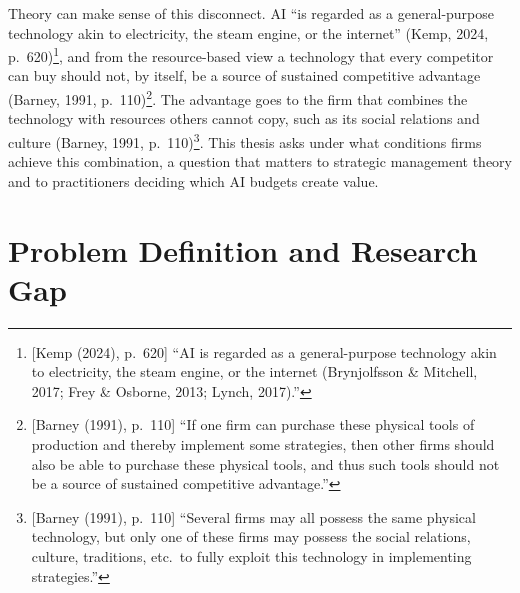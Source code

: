 \documentclass[12pt, a4paper]{article}
\begin{document}
Theory can make sense of this disconnect. AI ``is regarded as a general-purpose technology akin
to electricity, the steam engine, or the internet'' (Kemp, 2024, p.~620)\footnote{[Kemp (2024), p.~620] ``AI is regarded as a general-purpose technology akin to electricity, the steam engine, or the internet (Brynjolfsson \& Mitchell, 2017; Frey \& Osborne, 2013; Lynch, 2017).''},
and from the resource-based view a technology that every competitor can buy
should not, by itself, be a source of sustained competitive advantage (Barney,
1991, p.~110)\footnote{[Barney (1991), p.~110] ``If one firm can purchase these physical tools of production and thereby implement some strategies, then other firms should also be able to purchase these physical tools, and thus such tools should not be a source of sustained competitive advantage.''}. The advantage goes to the firm that combines the
technology with resources others cannot copy, such as its social relations
and culture (Barney, 1991, p.~110)\footnote{[Barney (1991), p.~110] ``Several firms may all possess the same physical technology, but only one of these firms may possess the social relations, culture, traditions, etc.\ to fully exploit this technology in implementing strategies.''}. This thesis asks under what conditions firms
achieve this combination, a question that matters to strategic management
theory and to practitioners deciding which AI budgets create value.

\section{Problem Definition and Research Gap}
\end{document}
